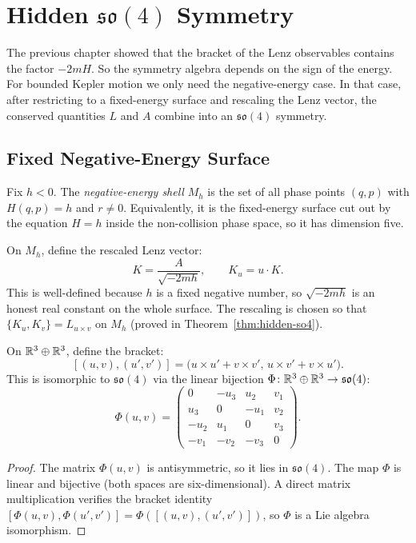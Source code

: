 \chapter{Hidden $\mathfrak{so}(4)$ Symmetry}\label{ch:so4}

The previous chapter showed that the bracket of the Lenz observables contains the factor $-2mH$.
So the symmetry algebra depends on the sign of the energy.
For bounded Kepler motion we only need the negative-energy case.
In that case, after restricting to a fixed-energy surface and rescaling the Lenz vector, the conserved quantities $L$ and $A$ combine into an $\mathfrak{so}(4)$ symmetry.

\section{Fixed Negative-Energy Surface}

\begin{definition}\label{def:negative-shell}
Fix $h < 0$.
The \emph{negative-energy shell} $M_h$ is the set of all phase points $(q, p)$ with $H(q, p) = h$ and $r \neq 0$.
Equivalently, it is the fixed-energy surface cut out by the equation $H = h$ inside the non-collision phase space, so it has dimension five.

On $M_h$, define the rescaled Lenz vector:
\[
  K = \frac{A}{\sqrt{-2mh}},
  \qquad
  K_u = u \cdot K.
\]
This is well-defined because $h$ is a fixed negative number, so $\sqrt{-2mh}$ is an honest real constant on the whole surface.
The rescaling is chosen so that $\{K_u, K_v\} = L_{u \times v}$ on $M_h$ (proved in Theorem~\ref{thm:hidden-so4}).
\leanok
\end{definition}

\begin{proposition}\label{thm:model-so4}
On $\mathbb{R}^3 \oplus \mathbb{R}^3$, define the bracket:
\[
  [(u,v),(u',v')] = \bigl(u \times u' + v \times v',\, u \times v' + v \times u'\bigr).
\]
This is isomorphic to $\mathfrak{so}(4)$ via the linear bijection $\Phi \colon \mathbb{R}^3 \oplus \mathbb{R}^3 \to \mathfrak{so}(4)$:
\[
  \Phi(u,v)
  = \begin{pmatrix}
      0   & -u_3 &  u_2 & v_1 \\
      u_3 &  0   & -u_1 & v_2 \\
     -u_2 &  u_1 &  0   & v_3 \\
     -v_1 & -v_2 & -v_3 & 0
    \end{pmatrix}.
\]
\leanok
\begin{proof}
The matrix $\Phi(u, v)$ is antisymmetric, so it lies in $\mathfrak{so}(4)$.
The map $\Phi$ is linear and bijective (both spaces are six-dimensional).
A direct matrix multiplication verifies the bracket identity
$[\Phi(u,v), \Phi(u',v')] = \Phi([(u,v),(u',v')])$,
so $\Phi$ is a Lie algebra isomorphism.
\end{proof}
\end{proposition}

